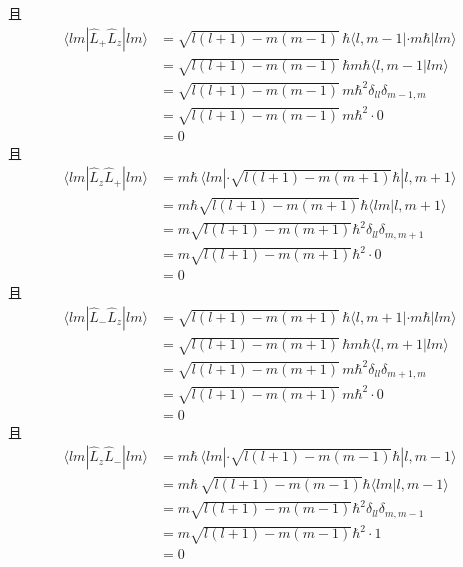 且
\begin{equation}
    \begin{aligned}
        \langle lm|\hat{L}_+\hat{L}_z|lm\rangle &=\sqrt{l\left( l+1 \right) -m\left( m-1 \right)}\,\hbar \langle l,m-1|\cdot m\hbar |lm\rangle 
\\
&=\sqrt{l\left( l+1 \right) -m\left( m-1 \right)}\,\hbar m\hbar \langle l,m-1|lm\rangle 
\\
&=\sqrt{l\left( l+1 \right) -m\left( m-1 \right)}\,m\hbar ^2\delta _{ll}\delta _{m-1,m}
\\
&=\sqrt{l\left( l+1 \right) -m\left( m-1 \right)}\,m\hbar ^2\cdot 0
\\
&=0
    \end{aligned}
\end{equation}
且
\begin{equation}
    \begin{aligned}
        \langle lm|\hat{L}_z\hat{L}_+|lm\rangle &=m\hbar \,\langle lm|\cdot \sqrt{l\left( l+1 \right) -m\left( m+1 \right)}\hbar |l,m+1\rangle 
\\
&=m\hbar \sqrt{l\left( l+1 \right) -m\left( m+1 \right)}\hbar \langle lm|l,m+1\rangle 
\\
&=m\sqrt{l\left( l+1 \right) -m\left( m+1 \right)}\hbar ^2\delta _{ll}\delta _{m,m+1}
\\
&=m\sqrt{l\left( l+1 \right) -m\left( m+1 \right)}\hbar ^2\cdot 0
\\
&=0
    \end{aligned}
\end{equation}
且
\begin{equation}
    \begin{aligned}
        \langle lm|\hat{L}_-\hat{L}_z|lm\rangle &=\sqrt{l\left( l+1 \right) -m\left( m+1 \right)}\,\hbar \langle l,m+1|\cdot m\hbar |lm\rangle 
\\
&=\sqrt{l\left( l+1 \right) -m\left( m+1 \right)}\,\hbar m\hbar \langle l,m+1|lm\rangle 
\\
&=\sqrt{l\left( l+1 \right) -m\left( m+1 \right)}\,m\hbar ^2\delta _{ll}\delta _{m+1,m}
\\
&=\sqrt{l\left( l+1 \right) -m\left( m+1 \right)}\,m\hbar ^2\cdot 0
\\
&=0
    \end{aligned}
\end{equation}
且
\begin{equation}
    \begin{aligned}
        \langle lm|\hat{L}_z\hat{L}_-|lm\rangle &=m\hbar \,\langle lm|\cdot \sqrt{l\left( l+1 \right) -m\left( m-1 \right)}\hbar |l,m-1\rangle 
\\
&=m\hbar \,\sqrt{l\left( l+1 \right) -m\left( m-1 \right)}\hbar \langle lm|l,m-1\rangle 
\\
&=m\sqrt{l\left( l+1 \right) -m\left( m-1 \right)}\hbar ^2\delta _{ll}\delta _{m,m-1}
\\
&=m\sqrt{l\left( l+1 \right) -m\left( m-1 \right)}\hbar ^2\cdot 1
\\
&=0
    \end{aligned}
\end{equation}
